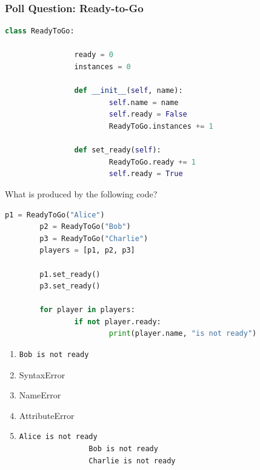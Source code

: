 \documentclass{beamer}
\begin{document}
%
%
%
\begin{frame}[fragile]
    \frametitle{Poll Question: Ready-to-Go}
    \begin{minipage}{0.69\textwidth}
        \begin{lstlisting}[language=Python, autogobble, basicstyle=\tiny]
        class ReadyToGo:

                ready = 0
                instances = 0

                def __init__(self, name):
                        self.name = name
                        self.ready = False
                        ReadyToGo.instances += 1

                def set_ready(self):
                        ReadyToGo.ready += 1
                        self.ready = True
        \end{lstlisting}
        \pause
        \vspace{0.1cm}
        What is produced by the following code?
        \vfill
        \begin{lstlisting}[language=Python, autogobble, basicstyle=\tiny]
        p1 = ReadyToGo("Alice")
        p2 = ReadyToGo("Bob")
        p3 = ReadyToGo("Charlie")
        players = [p1, p2, p3]

        p1.set_ready()
        p3.set_ready()

        for player in players:
                if not player.ready:
                        print(player.name, "is not ready")
        \end{lstlisting}
    \end{minipage}
    \hfill
    \begin{minipage}{0.29\textwidth}
        \begin{enumerate}[A]
            \item 
                \begin{lstlisting}[autogobble, basicstyle=\tiny]
                Bob is not ready
                \end{lstlisting}
            \item SyntaxError
            \item NameError
            \item AttributeError
            \item 
                \begin{lstlisting}[autogobble, basicstyle=\tiny]
                Alice is not ready
                Bob is not ready
                Charlie is not ready
                \end{lstlisting}
        \end{enumerate}
    \end{minipage}
\end{frame}
\end{document}
